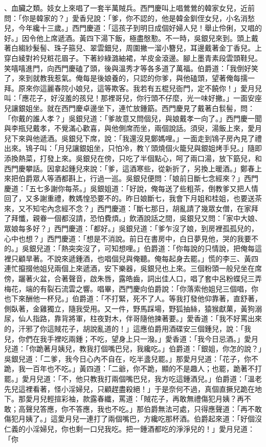 \begin{showcontents}{}
、血臟之類。妓女上來唱了一套半萬賊兵。西門慶叫上唱鶯鶯的韓家女兒，近前問：「你是韓家的？」愛香兒說：「爹，你不認的，他是韓金釧侄女兒，小名消愁兒，今年纔十三歲。」西門慶道：「這孩子到明日成個好婦人兒！舉止伶俐，又唱的好。」因令他上席遞酒。黃四下湯下飯，極盡慇懃。不一時，吳銀兒來到。頭上戴著白縐紗髮髻、珠子箍兒、翠雲鈿兒，周圍撇一溜小簪兒，耳邊戴著金丁香兒。上穿白綾對衿兒粧花眉子。下著紗綠潞紬裙，羊皮金滾邊。腳上墨青素段雲頭鞋兒。笑嘻嘻進門，向西門慶磕了頭，後與溫秀才等各多道了萬福。伯爵道：「我倒好笑了，來到就教我惹氣。俺每是後娘養的，只認的你爹，與他磕頭，望著俺每擩一拜。原來你這麗春院小娘兒，這等欺客。我若有五棍兒衙門，定不饒你！」愛月兒叫：「應花子，好沒羞的孩兒！那裡哥兒，你行頭不仔麼，光一味好撇。」一面安座兒讓銀姐坐。就在西門慶卓邊坐下，連忙放鍾筯。西門慶見了戴著白䯼髻，問：「你戴的誰人孝？」吳銀兒道：「爹故意又問個兒，與娘戴孝一向了。」西門慶一聞與李瓶兒戴孝，不覺滿心歡喜，與他側席而坐，兩個說話。須臾，湯飯上來，愛月兒下來與他遞酒。吳銀兒下席，說：「我還沒見鄭媽哩。」一面走到鴇子房內見了禮出來。鴇子叫：「月兒讓銀姐坐，只怕冷，教丫頭燒個火籠兒與銀姐烤手兒。」隨即添換熱菜，打發上來。吳銀兒在傍，只吃了半個點心，呵了兩口湯，放下筯兒，和西門慶攀話。因拿起鍾兒來說：「爹，這酒寒些，從新折了，另換上暖酒。」鄭春上來把伯爵眾人等酒都斟上，行過一巡。吳銀兒便問：「娘前日斷七念經來？」西門慶道：「五七多謝你每茶。」吳銀姐道：「好說，俺每送了些粗茶，倒教爹又把人情回了，又多謝重禮，教媽惶恐要不的。昨日娘斷七，我會下月姐和桂姐，也要送茶來，又不知宅內念經不念？」西門慶道：「斷七那日，胡亂請了幾眾女僧，在家拜了拜懺，親眷一個都沒請，恐怕費煩。」飲酒說話之間，吳銀兒又問：「家中大娘、眾娘每多好？」西門慶道：「都好。」吳銀兒道：「爹乍沒了娘，到房裡孤孤兒的，心中也想？」西門慶道：「想是不消說。前日在書房中，白日夢見他，哭的我要不的。」吳銀兒道：「熱突突沒了，可知想哩。」伯爵道：「你每說的只情說，把俺每這裡只顧旱著。不說來遞鍾酒，也唱個兒與俺聽。俺每起身去罷。」慌的李三、黃四連忙攛掇他姐兒兩個上來遞酒，安下樂器，吳銀兒也上來。三個粉頭一般兒坐在席傍，躧著火盆，合著聲音，啟朱唇，露皓齒，詞出佳人口，唱了套中呂粉蝶兒三弄梅花，端的有裂石流雲之響。唱畢，西門慶向伯爵說：「你落索他姐兒三個唱，你也下來酬他一杯兒。」伯爵道：「不打緊，死不了人。等我打發他仰靠著，直舒著，側臥著，金雞獨立，隨我受用。又一件，野馬踩場，野狐抽絲，猿猴獻菓，黃狗溺尿，仙人指路，靠背將軍，柱夜對木，伴哥隨他揀著要。」愛香道：「我不好罵出來的，汗邪了你這賊花子，胡說亂道的！」這應伯爵用酒碟安三個鍾兒，說：「我兒，你們在我手裡吃兩鍾；不吃，望身上只一潑。」愛香道：「我今日忌酒。」愛月兒道：「你跪著月姨兒，教我打個嘴巴兒，我纔吃。」伯爵道：「銀姐，你怎的說？」吳銀兒道：「二爹，我今日心內不自在，吃半盞兒罷。」那愛月兒道：「花子，你不跪，我一百年也不吃。」黃四道：「二爺，你不跪，顯的不是趣人；也罷，跪著不打罷。」愛月兒道：「不，他只教我打兩個嘴巴兒，我方吃這鍾酒兒。」伯爵道：「溫老先兒這裡看著，怪小淫婦兒，只顧趕盡殺絕！」于是奈何不過，真個直撅兒跪在地下。那愛月兒輕揎彩袖，款露春纖，罵道：「賊花子，再敢無禮傷犯月姨？再不敢；高聲兒答應，你不答應，我也不吃。」那伯爵無法可處，只得應聲道：「再不敢傷犯月姨了。」這愛月兒一連打了兩個嘴巴，方纔吃那杯酒。伯爵起來道：「好個沒仁義的小淫婦兒，你也剩一口兒我吃。把一鍾酒都吃的淨淨兒的！」愛月兒道：「你
\end{showcontents}

